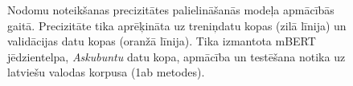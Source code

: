 \begin{figure}[h] 
   \centering
   \caption{Nodomu noteikšanas precizitātes palielināšanās modeļa apmācībās gaitā. Precizitāte tika aprēķināta uz treniņdatu kopas (zilā līnija) un validācijas datu kopas (oranžā līnija). Tika izmantota mBERT jēdzientelpa, \textit{Askubuntu} datu kopa, apmācība un testēšana notika uz latviešu valodas korpusa (1ab metodes).} 
   \label{fig:askubuntu-bert}
\end{figure}


